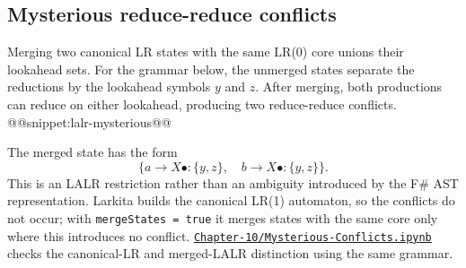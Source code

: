 \subsection{Mysterious reduce-reduce conflicts}
Merging two canonical LR states with the same LR(0) core unions their lookahead sets.
For the grammar below, the unmerged states separate the reductions by the lookahead symbols $y$ and $z$.
After merging, both productions can reduce on either lookahead, producing two reduce-reduce conflicts.
@@snippet:lalr-mysterious@@

The merged state has the form \[ \{a\rightarrow X\bullet:\{y,z\},\quad b\rightarrow X\bullet:\{y,z\}\}.
\] This is an LALR restriction rather than an ambiguity introduced by the F\# AST representation.
Larkita builds the canonical LR(1) automaton, so the conflicts do not occur; with \texttt{mergeStates = true} it merges states with the same core only where this introduces no conflict.
\href{../../Chapter-10/Mysterious-Conflicts.ipynb}{\nolinkurl{Chapter-10/Mysterious-Conflicts.ipynb}} checks the canonical-LR and merged-LALR distinction using the same grammar.
